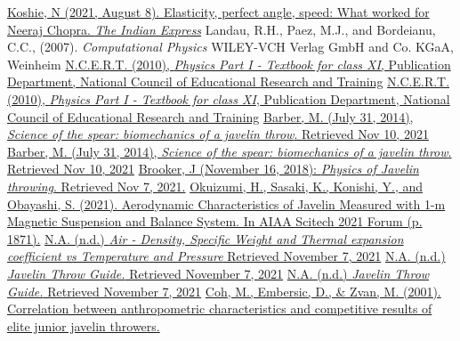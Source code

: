 \documentclass[12pt]{article}
\begin{document}
\newpage
\begin{thebibliography}{}
\href{https://indianexpress.com/article/olympics/elasticity-perfect-angle-speed-what-worked-for-neeraj-chopra-7443674/}{Koshie, N (2021, August 8). Elasticity, perfect angle, speed: What worked for Neeraj Chopra. \textit{The Indian Express}}
Landau, R.H., Paez, M.J., and Bordeianu, C.C., (2007). \textit{Computational Physics} WILEY-VCH Verlag GmbH and Co. KGaA, Weinheim
\href{https://ncert.nic.in/textbook/pdf/keph104.pdf}{N.C.E.R.T. (2010), \textit{Physics Part I - Textbook for class XI}, Publication Department, National Council of Educational Research and Training}
\href{https://ncert.nic.in/textbook/pdf/keph104.pdf}{N.C.E.R.T. (2010), \textit{Physics Part I - Textbook for class XI}, Publication Department, National Council of Educational Research and Training}
\href{https://theconversation.com/science-of-the-spear-biomechanics-of-a-javelin-throw-29782}{Barber, M. (July 31, 2014), \textit{Science of the spear: biomechanics of a javelin throw}. Retrieved Nov 10, 2021}
\href{https://theconversation.com/science-of-the-spear-biomechanics-of-a-javelin-throw-29782}{Barber, M. (July 31, 2014), \textit{Science of the spear: biomechanics of a javelin throw}. Retrieved Nov 10, 2021}
\href{https://www.sportsrec.com/6929852/physics-of-javelin-throwing}{Brooker, J (November 16, 2018): \textit{Physics of Javelin throwing}. Retrieved Nov 7, 2021.}
\href{https://arc.aiaa.org/doi/abs/10.2514/6.2021-1871}{Okuizumi, H., Sasaki, K., Konishi, Y., and Obayashi, S. (2021). Aerodynamic Characteristics of Javelin Measured with 1-m Magnetic Suspension and Balance System. In AIAA Scitech 2021 Forum (p. 1871).}
\href{https://www.engineeringtoolbox.com/air-density-specific-weight-d_600.html}{N.A. (n.d.) \textit{Air - Density, Specific Weight and Thermal expansion coefficient vs Temperature and Pressure} Retrieved November 7, 2021}
\href{https://www.sportsunlimitedinc.com/sportsu-javelin.html}{N.A. (n.d.) \textit{Javelin Throw Guide.} Retrieved November 7, 2021}
\href{https://www.sportsunlimitedinc.com/sportsu-javelin.html}{N.A. (n.d.) \textit{Javelin Throw Guide.} Retrieved November 7, 2021}
\href{https://ojs.ub.uni-konstanz.de/cpa/article/view/3783}{Coh, M., Embersic, D., \& Zvan, M. (2001). Correlation between anthropometric characteristics and competitive results of elite junior javelin throwers.}
\end{thebibliography}
\end{document}
